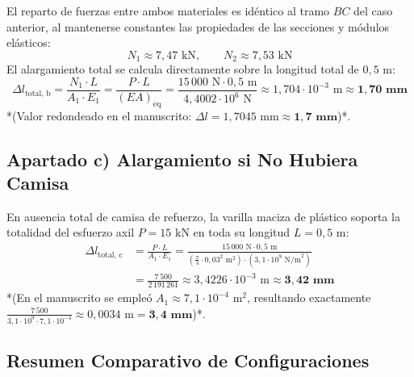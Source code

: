 El reparto de fuerzas entre ambos materiales es idéntico al tramo $BC$ del caso anterior, al mantenerse constantes las propiedades de las secciones y módulos elásticos:
\begin{equation}
    N_1 \approx 7{,}47\text{ kN}, \qquad N_2 \approx 7{,}53\text{ kN}
\end{equation}
El alargamiento total se calcula directamente sobre la longitud total de $0{,}5\text{ m}$:
\begin{equation}
    \Delta l_{\text{total, b}} = \frac{N_1 \cdot L}{A_1 \cdot E_1} = \frac{P \cdot L}{(EA)_{\text{eq}}} = \frac{15\,000\text{ N} \cdot 0{,}5\text{ m}}{4{,}4002 \cdot 10^6\text{ N}} \approx 1{,}704 \cdot 10^{-3}\text{ m} \approx \mathbf{1{,}70\text{ mm}}
\end{equation}
*(Valor redondeado en el manuscrito: $\Delta l = 1{,}7045\text{ mm} \approx \mathbf{1{,}7\text{ mm}}$)*.

\subsection{Apartado c) Alargamiento si No Hubiera Camisa}

En ausencia total de camisa de refuerzo, la varilla maciza de plástico soporta la totalidad del esfuerzo axil $P = 15\text{ kN}$ en toda su longitud $L = 0{,}5\text{ m}$:
\begin{align}
    \Delta l_{\text{total, c}} &= \frac{P \cdot L}{A_1 \cdot E_1} = \frac{15\,000\text{ N} \cdot 0{,}5\text{ m}}{\left(\frac{\pi}{4} \cdot 0{,}03^2\text{ m}^2\right) \cdot \left(3{,}1 \cdot 10^9\text{ N/m}^2\right)} \nonumber \\
    &= \frac{7\,500}{2\,191\,261} \approx 3{,}4226 \cdot 10^{-3}\text{ m} \approx \mathbf{3{,}42\text{ mm}}
\end{align}
*(En el manuscrito se empleó $A_1 \approx 7{,}1 \cdot 10^{-4}\text{ m}^2$, resultando exactamente $\frac{7\,500}{3{,}1 \cdot 10^9 \cdot 7{,}1 \cdot 10^{-4}} \approx 0{,}0034\text{ m} = \mathbf{3{,}4\text{ mm}}$)*.

\subsection*{Resumen Comparativo de Configuraciones}

